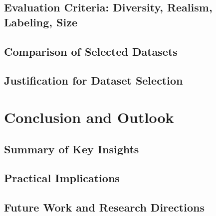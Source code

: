 \section{Evaluation Criteria: Diversity, Realism, Labeling, Size}
\section{Comparison of Selected Datasets}
\section{Justification for Dataset Selection}

\chapter{Conclusion and Outlook}
\section{Summary of Key Insights}
\section{Practical Implications}
\section{Future Work and Research Directions}
